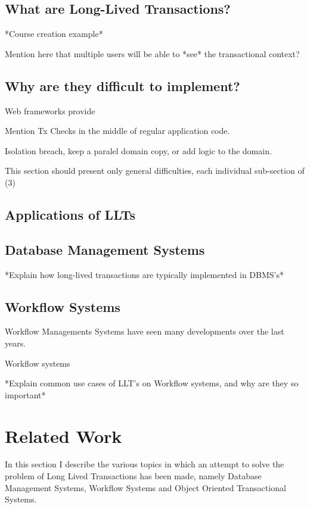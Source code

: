 \documentclass{llncs}
\begin{document}
\subsection{What are Long-Lived Transactions?}

*Course creation example*

Mention here that multiple users will be able to *see* the
transactional context?

\subsection{Why are they difficult to implement?}

Web frameworks provide 

Mention Tx Checks in the middle of regular application code.

Isolation breach, keep a paralel domain copy, or add logic to the
domain.

This section should present only general difficulties, each individual
sub-section of (3)

\subsection{Applications of LLTs}

\subsection{Database Management Systems}

*Explain how long-lived transactions are typically implemented in DBMS's*

\subsection{Workflow Systems}

Workflow Managements Systems have seen many developments over the last
years.

Workflow systems 

*Explain common use cases of LLT's on Workflow systems, and why are
they so important*


\section{Related Work}

In this section I describe the various topics in which an attempt to
solve the problem of Long Lived Transactions has been made, namely
Database Management Systems, Workflow Systems and Object Oriented
Transactional Systems.
\end{document}
